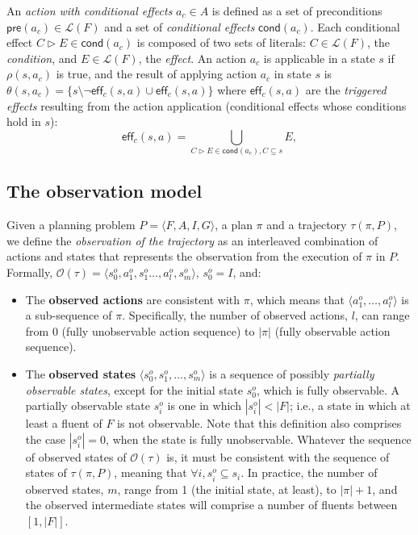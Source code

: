 \documentclass{article}
\newcommand{\tup}[1]{{\langle #1 \rangle}}
\newcommand{\pre}{\mathsf{pre}}     %
\newcommand{\eff}{\mathsf{eff}}     %
\newcommand{\cond}{\mathsf{cond}}   %
\begin{document}
An {\em action with conditional effects} $a_c\in A$ is defined as a set of preconditions $\pre(a_c)\in\mathcal{L}(F)$ and a set of {\em conditional effects} $\cond(a_c)$. Each conditional effect $C\rhd E\in\cond(a_c)$ is composed of two sets of literals: $C\in\mathcal{L}(F)$, the {\em condition}, and $E\in\mathcal{L}(F)$, the {\em effect}. An action $a_c$ is applicable in a state $s$ if $\rho(s,a_c)$ is true, and the result of applying action $a_c$ in state $s$ is $\theta(s,a_c)=\{s\setminus\neg\eff_c(s,a)\cup\eff_c(s,a)\}$ where $\eff_c(s,a)$ are the {\em triggered effects} resulting from the action application (conditional effects whose conditions hold in $s$):
\[
\eff_c(s,a)=\bigcup_{C\rhd E\in\cond(a_c),C\subseteq s} E,
\]

\subsection{The observation model}
Given a planning problem $P=\tup{F,A,I,G}$, a plan $\pi$ and a trajectory $\tau(\pi,P)$, we define the \emph{observation of the trajectory} as an interleaved combination of actions and states that represents the observation from the execution of $\pi$ in $P$. Formally, $\mathcal{O}(\tau)=\tup{s_0^o,a_1^o,s_1^o \ldots , a_l^o, s_m^o}$, $s_0^o=I$, and:


\begin{itemize}
\item The {\bf observed actions} are consistent with $\pi$, which means that $\tup{a_1^o, \ldots, a_l^o}$ is a sub-sequence of $\pi$. Specifically, the number of observed actions, $l$, can range from $0$ (fully unobservable action sequence) to $|\pi|$ (fully observable action sequence).
\item The {\bf observed states} $\tup{s_0^o, s_1^o, \ldots, s_m^o}$ is a sequence of possibly {\em partially observable states}, except for the initial state $s_0^o$, which is fully observable. A partially observable state $s_i^o$ is one in which $|s_i^o| < |F|$; i.e., a state in which at least a fluent of $F$ is not observable. Note that this definition also comprises the case $|s_i^o| = 0$, when the state is fully unobservable. Whatever the sequence of observed states of $\mathcal{O}(\tau)$ is, it must be consistent with the sequence of states of $\tau(\pi,P)$, meaning that $\forall i, s_i^o \subseteq s_i$. In practice, the number of observed states, $m$, range from 1 (the initial state, at least), to $|\pi|+1$, and the observed intermediate states will comprise a number of fluents between $[1,|F|]$.
\end{itemize}
\end{document}
